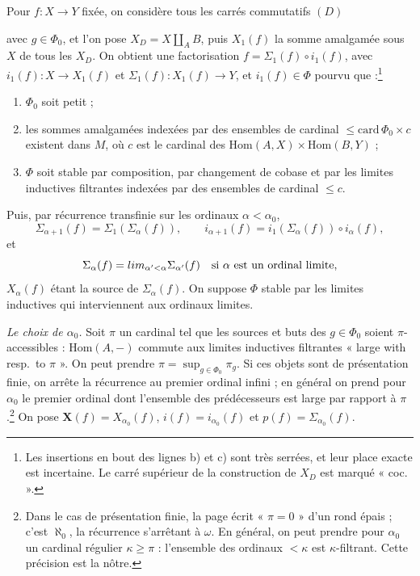 \documentclass[11pt,a4paper]{article}
\begin{document}
Pour $f : X \to Y$ fixée, on considère tous les carrés commutatifs $(D)$


avec $g \in \Phi_0$, et l'on pose $X_D = X \amalg_A B$, puis $X_1(f)$ la somme
amalgamée sous $X$ de tous les $X_D$. On obtient une factorisation
$f = \Sigma_1(f) \circ i_1(f)$, avec $i_1(f) : X \to X_1(f)$ et
$\Sigma_1(f) : X_1(f) \to Y$, et $i_1(f) \in \Phi$ pourvu que :\footnote{Les insertions en bout des lignes b) et c) sont très serrées, et
leur place exacte est incertaine. Le carré supérieur de la construction de
$X_D$ est marqué « coc. ».}
\begin{enumerate}
\item[a)] $\Phi_0$ soit petit ;
\item[b)] les sommes amalgamées indexées par des ensembles de cardinal
$\leqslant \mathrm{card}\, \Phi_0 \times c$ existent dans $M$, où $c$ est le
cardinal des $\mathrm{Hom}(A, X) \times \mathrm{Hom}(B, Y)$ ;
\item[c)] $\Phi$ soit stable par composition, par changement de cobase et par
les limites inductives filtrantes indexées par des ensembles de cardinal
$\leqslant c$.
\end{enumerate}

Puis, par récurrence transfinie sur les ordinaux $\alpha < \alpha_0$,
\[
\Sigma_{\alpha+1}(f) = \Sigma_1(\Sigma_\alpha(f)), \qquad
i_{\alpha+1}(f) = i_1(\Sigma_\alpha(f)) \circ i_\alpha(f),
\]
et
\[
\Sigma_\alpha(f) = \varinjlim_{\alpha' < \alpha} \Sigma_{\alpha'}(f)
\quad \text{si } \alpha \text{ est un ordinal limite},
\]
$X_\alpha(f)$ étant la source de $\Sigma_\alpha(f)$. On suppose $\Phi$ stable
par les limites inductives qui interviennent aux ordinaux limites.

\emph{Le choix de $\alpha_0$.} Soit $\pi$ un cardinal tel que les sources et
buts des $g \in \Phi_0$ soient $\pi$-accessibles : $\mathrm{Hom}(A, -)$
commute aux limites inductives filtrantes « large with resp.\ to $\pi$ ». On
peut prendre $\pi = \sup_{g \in \Phi_0} \pi_g$. Si ces objets sont de
présentation finie, on arrête la récurrence au premier ordinal infini ; en
général on prend pour $\alpha_0$ le premier ordinal dont l'ensemble des
prédécesseurs est large par rapport à $\pi$.\footnote{Dans le cas de
présentation finie, la page écrit « $\pi = 0$ » d'un rond épais ; c'est
$\aleph_0$, la récurrence s'arrêtant à $\omega$. En général, on peut prendre
pour $\alpha_0$ un cardinal régulier $\kappa \geqslant \pi$ : l'ensemble des
ordinaux $< \kappa$ est $\kappa$-filtrant. Cette précision est la nôtre.} On
pose $\mathbf{X}(f) = X_{\alpha_0}(f)$, $i(f) = i_{\alpha_0}(f)$ et
$p(f) = \Sigma_{\alpha_0}(f)$.
\end{document}
